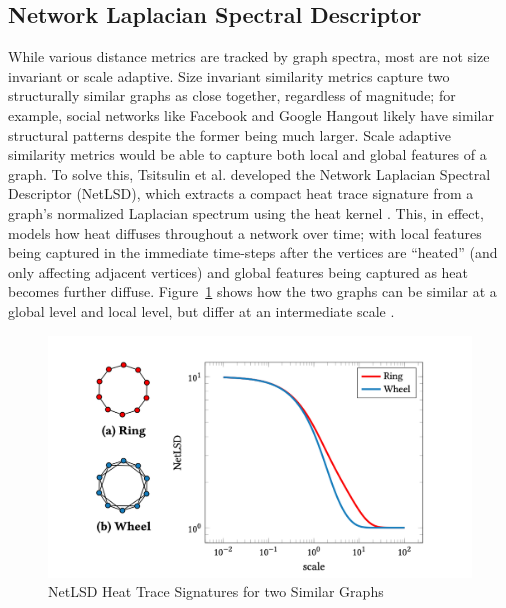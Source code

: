 \subsection{Network Laplacian Spectral Descriptor}\label{sec:NetLSD}

While various distance metrics are tracked by graph spectra, most are not size
invariant or scale adaptive. Size invariant similarity metrics capture two
structurally similar graphs as close together, regardless of magnitude; for
example, social networks like Facebook and Google Hangout likely have similar
structural patterns despite the former being much larger. Scale adaptive
similarity metrics would be able to capture both local and global features of a
graph. To solve this, Tsitsulin et al. developed the Network Laplacian Spectral
Descriptor (NetLSD), which extracts a compact heat trace signature from a
graph's normalized Laplacian spectrum using the heat kernel \cite{netlsd}. This,
in effect, models how heat diffuses throughout a network over time; with local
features being captured in the immediate time-steps after the vertices are
``heated'' (and only affecting adjacent vertices) and global features being
captured as heat becomes further diffuse. Figure~\ref{fig:heat_trace_ex} shows
how the two graphs can be similar at a global level and local level, but differ
at an intermediate scale \cite{netlsd}.

\begin{singlespacing}
    \begin{figure}[H]
    \centering
    \includegraphics[scale=0.25]{Figures/heat_trace_ex}
    \caption[NetLSD Heat Trace Signatures for two Similar Graphs \cite{netlsd}]{NetLSD Heat Trace Signatures for two Similar Graphs \cite{netlsd}}
    \label{fig:heat_trace_ex}
    \end{figure}
\end{singlespacing}

